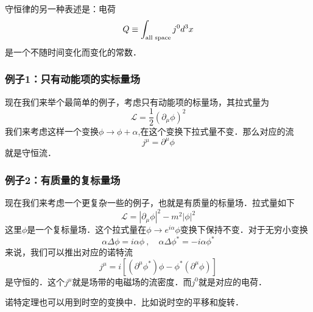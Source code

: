 守恒律的另一种表述是：电荷
\begin{equation}
Q \equiv \int_{\rm all\,\, space} j^0 d^3 x
\end{equation}
是一个不随时间变化而变化的常数．
\subsubsection{例子1：只有动能项的实标量场}
现在我们来举个最简单的例子，考虑只有动能项的标量场，其拉式量为
\begin{equation}
\mathcal L = \frac{1}{2} (\partial_\mu \phi)^2
\end{equation}
我们来考虑这样一个变换$\phi \rightarrow \phi + \alpha $,在这个变换下拉式量不变．那么对应的流
\begin{equation}
j^\mu = \partial^\mu \phi
\end{equation}
就是守恒流．
\subsubsection{例子2：有质量的复标量场}
现在我们来考虑一个更复杂一些的例子，也就是有质量的标量场．拉式量如下
\begin{equation}
\mathcal L = |\partial_\mu\phi|^2 - m^2 |\phi|^2
\end{equation}
这里$\phi$是一个复标量场．这个拉式量在$\phi\rightarrow e^{i\alpha}\phi$变换下保持不变．对于无穷小变换
\begin{equation}
\alpha \Delta \phi = i \alpha \phi~,\quad \alpha \Delta \phi^* = -i\alpha \phi^*
\end{equation}
来说，我们可以推出对应的诺特流
\begin{equation}
j^\mu = i[(\partial^\mu \phi^*)\phi-\phi^*(\partial^\mu \phi)]
\end{equation}
是守恒的．这个$j^\mu$就是场带的电磁场的流密度．而$j^0$就是对应的电荷．

诺特定理也可以用到时空的变换中．比如说时空的平移和旋转．












